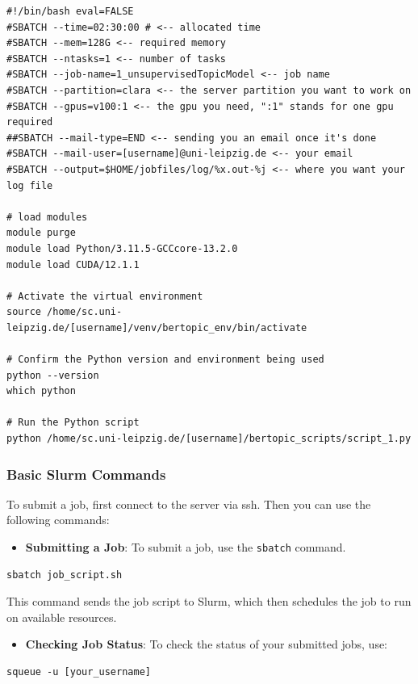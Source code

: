 \documentclass[
  letterpaper,
  DIV=11,
  numbers=noendperiod]{scrartcl}
\providecommand{\tightlist}{%
  \setlength{\itemsep}{0pt}\setlength{\parskip}{0pt}}\usepackage{longtable,booktabs,array}
\begin{document}
\begin{verbatim}
#!/bin/bash eval=FALSE  
#SBATCH --time=02:30:00 # <-- allocated time  
#SBATCH --mem=128G <-- required memory
#SBATCH --ntasks=1 <-- number of tasks  
#SBATCH --job-name=1_unsupervisedTopicModel <-- job name  
#SBATCH --partition=clara <-- the server partition you want to work on  
#SBATCH --gpus=v100:1 <-- the gpu you need, ":1" stands for one gpu required  
##SBATCH --mail-type=END <-- sending you an email once it's done  
#SBATCH --mail-user=[username]@uni-leipzig.de <-- your email  
#SBATCH --output=$HOME/jobfiles/log/%x.out-%j <-- where you want your log file  

# load modules  
module purge  
module load Python/3.11.5-GCCcore-13.2.0  
module load CUDA/12.1.1     

# Activate the virtual environment  
source /home/sc.uni-leipzig.de/[username]/venv/bertopic_env/bin/activate  

# Confirm the Python version and environment being used  
python --version  
which python  

# Run the Python script  
python /home/sc.uni-leipzig.de/[username]/bertopic_scripts/script_1.py  
\end{verbatim}

\subsubsection{Basic Slurm Commands}\label{basic-slurm-commands}

To submit a job, first connect to the server via ssh. Then you can use
the following commands:

\begin{itemize}
\tightlist
\item
  \textbf{Submitting a Job}: To submit a job, use the \texttt{sbatch}
  command.
\end{itemize}

\begin{verbatim}
sbatch job_script.sh
\end{verbatim}

This command sends the job script to Slurm, which then schedules the job
to run on available resources.

\begin{itemize}
\tightlist
\item
  \textbf{Checking Job Status}: To check the status of your submitted
  jobs, use:
\end{itemize}

\begin{verbatim}
squeue -u [your_username]
\end{verbatim}
\end{document}
